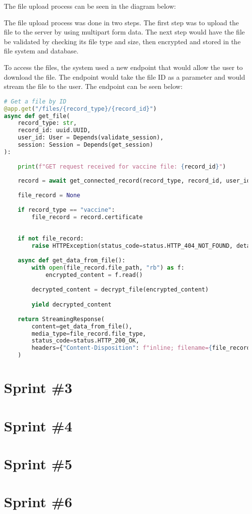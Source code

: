 The file upload process can be seen in the diagram below:


The file upload process was done in two steps. The first step was to upload the file to the server by using multipart form data. The next step would have the file be validated by checking its file type and size, then encrypted and stored in the file system and database. 

To access the files, the system used a new endpoint that would allow the user to download the file. The endpoint would take the file ID as a parameter and would stream the file to the user. The endpoint can be seen below:

\begin{lstlisting}[language=Python, caption=File Download Endpoint]
    # Get a file by ID
@app.get("/files/{record_type}/{record_id}")
async def get_file(
    record_type: str,
    record_id: uuid.UUID,
    user_id: User = Depends(validate_session),
    session: Session = Depends(get_session)    
):
    
    print(f"GET request received for vaccine file: {record_id}")
    
    record = await get_connected_record(record_type, record_id, user_id, session)
    
    file_record = None
    
    if record_type == "vaccine":
        file_record = record.certificate
    
    
    if not file_record:
        raise HTTPException(status_code=status.HTTP_404_NOT_FOUND, detail="File not found")
    
    async def get_data_from_file():
        with open(file_record.file_path, "rb") as f:
            encrypted_content = f.read()
            
        decrypted_content = decrypt_file(encrypted_content)

        yield decrypted_content
        
    return StreamingResponse(
        content=get_data_from_file(),
        media_type=file_record.file_type,
        status_code=status.HTTP_200_OK,
        headers={"Content-Disposition": f"inline; filename={file_record.name}"}
    )
\end{lstlisting}



\section{Sprint \#3}

\section{Sprint \#4}

\section{Sprint \#5}

\section{Sprint \#6}